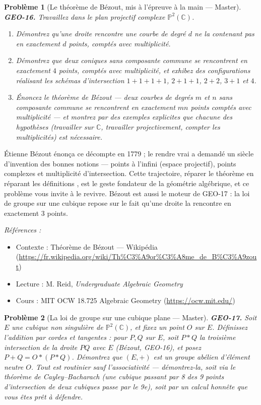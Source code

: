 \documentclass[11pt]{article}
\newtheorem{problem}{Problème}
\newenvironment{refs}{\par\small\noindent\emph{Références :}\begin{itemize}\setlength\itemsep{0pt}}{\end{itemize}\normalsize}
\begin{document}
\begin{problem}[{Le théorème de Bézout, mis à l'épreuve à la main --- Master}]
\textbf{GEO-16.} Travaillez dans le plan projectif complexe $ \mathbb{P}^2(\mathbb{C}) $.
\begin{enumerate}
\item[(a)] Démontrez qu'une droite rencontre une courbe de degré $ d $ ne la contenant pas en
exactement $ d $ points, comptés avec multiplicité.
\item[(b)] Démontrez que deux coniques sans composante commune se rencontrent en exactement $ 4 $
points, comptés avec multiplicité, et exhibez des configurations réalisant les schémas
d'intersection $ 1{+}1{+}1{+}1 $, $ 2{+}1{+}1 $, $ 2{+}2 $, $ 3{+}1 $ et $ 4 $.
\item[(c)] Énoncez le théorème de Bézout --- deux courbes de degrés $ m $ et $ n $ sans composante
commune se rencontrent en exactement $ mn $ points comptés avec multiplicité --- et montrez par des
exemples explicites que chacune des hypothèses (travailler sur $ \mathbb{C} $, travailler
projectivement, compter les multiplicités) est nécessaire.
\end{enumerate}

\end{problem}

\noindent Étienne Bézout énonça ce décompte en 1779 ; le rendre vrai a demandé un siècle
d'invention des bonnes notions --- points à l'infini (espace projectif), points complexes et
multiplicité d'intersection. Cette trajectoire, \og{} réparer le théorème en réparant les définitions \fg{},
est le geste fondateur de la géométrie algébrique, et ce problème vous invite à le revivre. Bézout
est aussi le moteur de GEO-17 : la loi de groupe sur une cubique repose sur le fait qu'une droite
la rencontre en exactement 3 points.

\begin{refs}
\item Contexte : Théorème de Bézout --- Wikipédia (\url{https://fr.wikipedia.org/wiki/Th%C3%A9or%C3%A8me_de_B%C3%A9zout})
\item Lecture : M. Reid, \textit{Undergraduate Algebraic Geometry}
\item Cours : MIT OCW 18.725 Algebraic Geometry (\url{https://ocw.mit.edu/})
\end{refs}

\bigskip

\begin{problem}[{La loi de groupe sur une cubique plane --- Master}]
\textbf{GEO-17.} Soit $ E $ une cubique non singulière de
$ \mathbb{P}^2(\mathbb{C}) $, et fixez un point $ O $ sur $ E $. Définissez l'addition par
cordes et tangentes : pour $ P, Q $ sur $ E $, soit $ P \ast Q $ la troisième intersection de
la droite $ PQ $ avec $ E $ (Bézout, GEO-16), et posez $ P + Q = O \ast (P \ast Q) $.
Démontrez que $ (E, +) $ est un groupe abélien d'élément neutre $ O $. Tout est routinier sauf
l'associativité --- démontrez-la, soit via le théorème de Cayley--Bacharach (une cubique passant par
8 des 9 points d'intersection de deux cubiques passe par le 9e), soit par un calcul
honnête que vous êtes prêt à défendre.
\end{problem}
\end{document}
